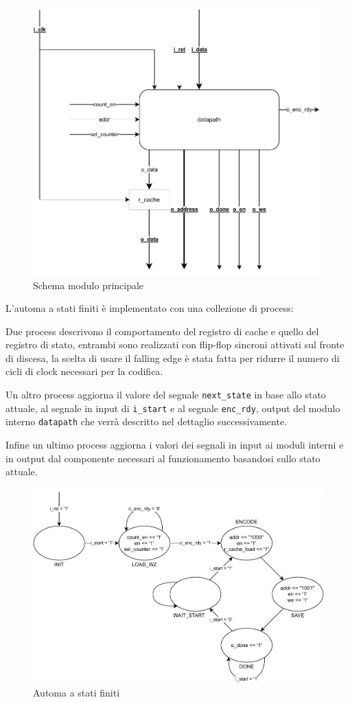 \documentclass[a4paper]{article}
\begin{document}
\begin{figure}[H]
  \includegraphics[width=12cm]{schema-main.pdf}
  \caption{Schema modulo principale}
  \label{fig:schema}
\end{figure}

L'automa a stati finiti è implementato con una collezione di process:

Due process descrivono il comportamento del registro di cache e quello del registro di stato, entrambi sono realizzati con flip-flop sincroni attivati sul fronte di discesa, la scelta di usare il falling edge è stata fatta per ridurre il numero di cicli di clock necessari per la codifica.

Un altro process aggiorna il valore del segnale \texttt{next\_state} in base allo stato attuale, al segnale in input di \texttt{i\_start} e al segnale \texttt{enc\_rdy}, output del modulo interno \texttt{datapath} che verrà descritto nel dettaglio successivamente.

Infine un ultimo process aggiorna i valori dei segnali in input ai moduli interni e in output dal componente necessari al funzionamento basandosi sullo stato attuale.

\begin{figure}[H]
  \centering
  \includegraphics[width=12.5cm]{schema-fsa.pdf}
  \caption{Automa a stati finiti}
  \label{fig:fsa}
\end{figure}
\end{document}
